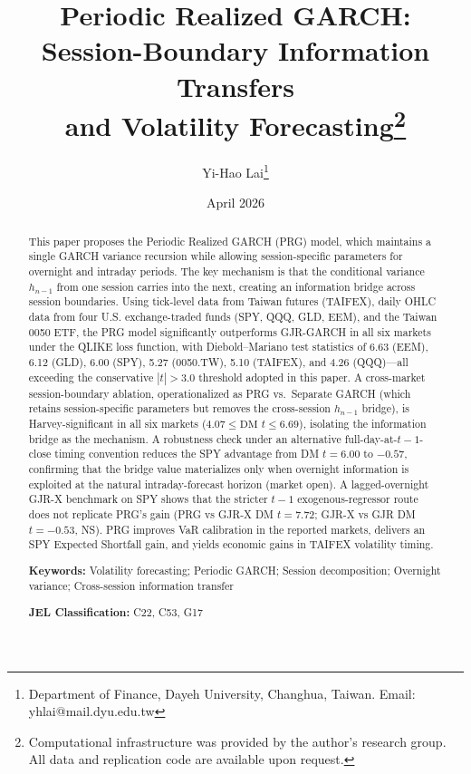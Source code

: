 \documentclass[11pt,a4paper]{article}
\title{Periodic Realized GARCH: \\ Session-Boundary Information Transfers \\ and Volatility Forecasting\thanks{%
Computational infrastructure was provided by the author's research group.
All data and replication code are available upon request.}}
\author{Yi-Hao Lai\thanks{%
Department of Finance, Dayeh University, Changhua, Taiwan.
Email: yhlai@mail.dyu.edu.tw}}
\date{April 2026}
\begin{document}
\maketitle

\begin{abstract}
This paper proposes the Periodic Realized GARCH (PRG) model, which maintains a single GARCH variance recursion while allowing session-specific parameters for overnight and intraday periods. The key mechanism is that the conditional variance $h_{n-1}$ from one session carries into the next, creating an information bridge across session boundaries. Using tick-level data from Taiwan futures (TAIFEX), daily OHLC data from four U.S. exchange-traded funds (SPY, QQQ, GLD, EEM), and the Taiwan 0050 ETF, the PRG model significantly outperforms GJR-GARCH in all six markets under the QLIKE loss function, with Diebold--Mariano test statistics of 6.63 (EEM), 6.12 (GLD), 6.00 (SPY), 5.27 (0050.TW), 5.10 (TAIFEX), and 4.26 (QQQ)---all exceeding the conservative $|t|>3.0$ threshold adopted in this paper. A cross-market session-boundary ablation, operationalized as PRG vs.\ Separate GARCH (which retains session-specific parameters but removes the cross-session $h_{n-1}$ bridge), is Harvey-significant in all six markets ($4.07 \leq \text{DM } t \leq 6.69$), isolating the information bridge as the mechanism. A robustness check under an alternative full-day-at-$t{-}1$-close timing convention reduces the SPY advantage from DM $t = 6.00$ to $-0.57$, confirming that the bridge value materializes only when overnight information is exploited at the natural intraday-forecast horizon (market open). A lagged-overnight GJR-X benchmark on SPY shows that the stricter $t{-}1$ exogenous-regressor route does not replicate PRG's gain (PRG vs GJR-X DM $t = 7.72$; GJR-X vs GJR DM $t = -0.53$, NS). PRG improves VaR calibration in the reported markets, delivers an SPY Expected Shortfall gain, and yields economic gains in TAIFEX volatility timing.

\medskip\noindent
\textbf{Keywords:} Volatility forecasting; Periodic GARCH; Session decomposition; Overnight variance; Cross-session information transfer

\medskip\noindent
\textbf{JEL Classification:} C22, C53, G17
\end{abstract}

\newpage

\end{document}
